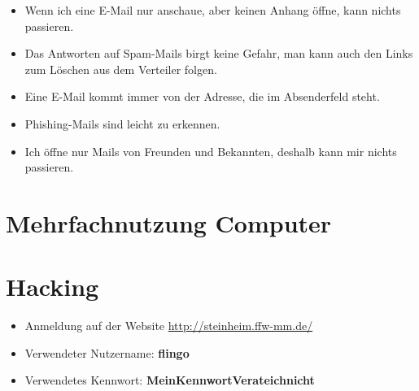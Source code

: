 \begin{frame}
\begin{itemize}
	\item Wenn ich eine E-Mail nur anschaue, aber keinen Anhang öffne, kann nichts passieren.
	\item Das Antworten auf Spam-Mails birgt keine Gefahr, man kann auch den Links zum Löschen aus dem Verteiler folgen.
	\item Eine E-Mail kommt immer von der Adresse, die im Absenderfeld steht.
	\item Phishing-Mails sind leicht zu erkennen.
	\item Ich öffne nur Mails von Freunden und Bekannten, deshalb kann mir nichts passieren.
\end{itemize}
\end{frame}

\section{Mehrfachnutzung Computer}


\section{Hacking}

\begin{frame}
\begin{itemize}
	\item Anmeldung auf der Website \href{http://steinheim.ffw-mm.de/}{http://steinheim.ffw-mm.de/}
	\item Verwendeter Nutzername: \textbf{flingo}
	\item Verwendetes Kennwort: \textbf{MeinKennwortVerateichnicht}
\end{itemize}
\end{frame}

